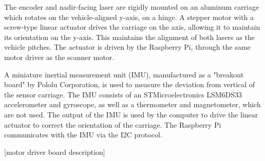 The encoder and nadir-facing laser are rigidly mounted on an aluminum carriage which rotates on the vehicle-aligned y-axis, on a hinge. A stepper motor with a screw-type linear actuator drives the carriage on the axis, allowing it to maintain its orientation on the y-axis. This maintains the alignment of both lasers as the vehicle pitches. The actuator is driven by the Raspberry Pi, through the  same motor driver as the scanner motor.

A miniature inertial measurement unit (IMU), manufactured as a "breakout board" by Pololu Corporation, is used to measure the deviation from vertical of the sensor carriage. The IMU consists of an STMicroelectronics LSM6DS33 accelerometer and gyroscope, as well as a thermometer and magnetometer, which are not used. The output of the IMU is used by the computer to drive the linear actuator to correct the orientation of the carriage. The Raspberry Pi communicates with the IMU via the I2C protocol.


[motor driver board description]



